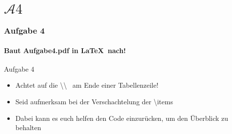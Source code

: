 \section{$\mathcal{A}4$} 
\begin{frame}
\frametitle{Aufgabe 4}
\framesubtitle{Baut Aufgabe4.pdf in \LaTeX ~nach!} 

\begin{block}{Aufgabe 4}
\begin{itemize}
  \item Achtet auf die \color{nounibaredII}\textbackslash \textbackslash  \color{black}~ am Ende einer Tabellenzeile!%
  \item Seid aufmerksam bei der Verschachtelung der \color{nounibaredII}\textbackslash item\color{black}s%
  \item Dabei kann es euch helfen den Code einzur\"ucken, um den \"Uberblick zu behalten%
\end{itemize}
\end{block}
\end{frame}
